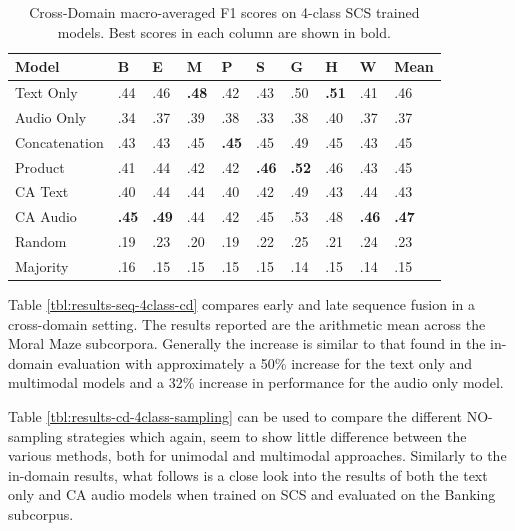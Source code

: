 \documentclass[twocolumn,twoside]{article}
\begin{document}
\begin{table}[t!]
\centering
\caption{Cross-Domain macro-averaged F1 scores on 4-class SCS trained models. Best scores in each column are shown in bold. \label{tbl:cross-4-SCS}}
\begin{tabular}{|l|llllllll|l|}
\hline
Model         & B            & E            & M            & P            & S            & G            & H            & W            & Mean \\ \hline
Text Only     & .44          & .46          & \textbf{.48} & .42          & .43          & .50          & \textbf{.51} & .41          & .46  \\
Audio Only    & .34          & .37          & .39          & .38          & .33          & .38          & .40          & .37          & .37 \\ \hline
Concatenation & .43          & .43          & .45          & \textbf{.45} & .45          & .49          & .45          & .43          & .45  \\
Product       & .41          & .44          & .42          & .42          & \textbf{.46} & \textbf{.52} & .46          & .43          & .45 \\
CA Text       & .40          & .44          & .44          & .40          & .42          & .49          & .43          & .44          & .43  \\
CA Audio      & \textbf{.45} & \textbf{.49} & .44          & .42          & .45          & .53          & .48          & \textbf{.46} & \textbf{.47}  \\ \hline
Random        & .19          & .23          & .20          & .19          & .22          & .25          & .21          & .24          & .23 \\
Majority      & .16          & .15          & .15          & .15          & .15          & .14          & .15          & .14          & .15  \\ \hline
\end{tabular}
\end{table}

Table \ref{tbl:results-seq-4class-cd} compares early and late sequence
fusion in a cross-domain setting. The results reported are the
arithmetic mean across the Moral Maze subcorpora. Generally the increase
is similar to that found in the in-domain evaluation with approximately
a 50\% increase for the text only and multimodal models and a 32\%
increase in performance for the audio only model.

Table \ref{tbl:results-cd-4class-sampling} can be used to compare the
different NO-sampling strategies which again, seem to show little
difference between the various methods, both for unimodal and multimodal
approaches. Similarly to the in-domain results, what follows is a close
look into the results of both the text only and CA audio models when
trained on SCS and evaluated on the Banking subcorpus.
\end{document}
